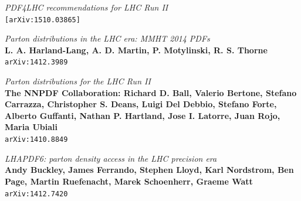 \documentclass[11pt,a4paper]{report}
\begin{document}
\begin{thebibliography}{9}
	\textit{PDF4LHC recommendations for LHC Run II}\\
	\texttt{[arXiv:1510.03865]}	
	
	\textit{Parton distributions in the LHC era: MMHT 2014 PDFs}\\
	\textbf{L. A. Harland-Lang, A. D. Martin, P. Motylinski, R. S. Thorne}\\
	\texttt{arXiv:1412.3989}
	
	\textit{Parton distributions for the LHC Run II}\\
	\textbf{The NNPDF Collaboration: Richard D. Ball, Valerio Bertone, Stefano Carrazza, Christopher S. Deans, Luigi Del Debbio, Stefano Forte, Alberto Guffanti, Nathan P. Hartland, Jose I. Latorre, Juan Rojo, Maria Ubiali}\\
	\texttt{arXiv:1410.8849}
	
	\textit{LHAPDF6: parton density access in the LHC precision era}\\
	\textbf{Andy Buckley, James Ferrando, Stephen Lloyd, Karl Nordstrom, Ben Page, Martin Ruefenacht, Marek Schoenherr, Graeme Watt}\\
	\texttt{arXiv:1412.7420}


\end{thebibliography}
\end{document}
